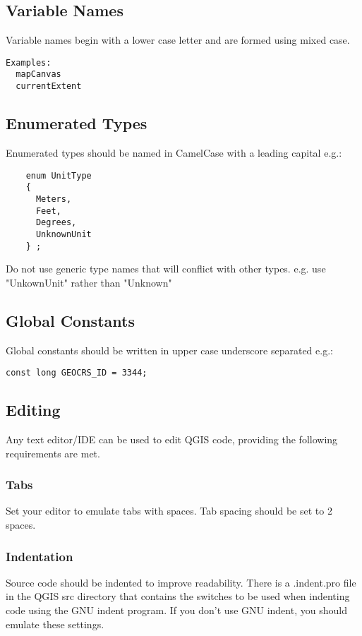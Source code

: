 \subsection{Variable Names}
Variable names begin with a lower case letter and are formed using mixed case.

\begin{verbatim}
Examples:
  mapCanvas
  currentExtent
\end{verbatim}

\subsection{Enumerated Types}
Enumerated types should be named in CamelCase with a leading capital e.g.:

\begin{verbatim}
    enum UnitType
    {
      Meters,
      Feet,
      Degrees,
      UnknownUnit
    } ;
\end{verbatim}

Do not use generic type names that will conflict with other types. e.g. use
"UnkownUnit" rather than "Unknown"

\subsection{Global Constants}
Global constants should be written in upper case underscore separated e.g.:

\begin{verbatim}
const long GEOCRS_ID = 3344;
\end{verbatim}

\subsection{Editing}
Any text editor/IDE can be used to edit QGIS code, providing the following
requirements are met.

\subsubsection{Tabs}
Set your editor to emulate tabs with spaces. Tab spacing should be set to 2
spaces.

\subsubsection{Indentation}
Source code should be indented to improve readability. There is a .indent.pro
file in the QGIS src directory that contains the switches to be used when
indenting code using the GNU indent program. If you don't use GNU indent, you
should emulate these settings.

